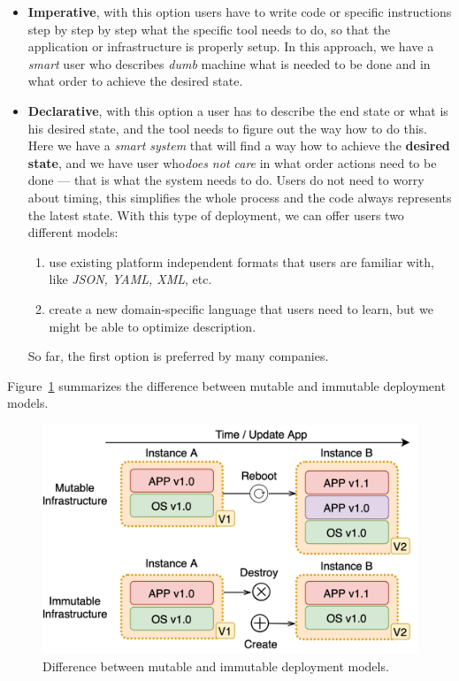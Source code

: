 \begin{itemize}
	\item \textbf{Imperative}, with this option users have to write code or specific instructions step by step by step what the specific tool needs to do, so that the application or infrastructure is properly setup. In this approach, we have a \textit{smart} user who describes \textit{dumb} machine what is needed to be done and in what order to achieve the desired state.
	\item \textbf{Declarative}, with this option a user has to describe the end state or what is his desired state, and the tool needs to figure out the way how to do this. Here we have a \textit{smart system} that will find a way how to achieve the \textbf{desired state}, and we have user who\textit{does not care} in what order actions need to be done --- that is what the system needs to do. Users do not need to worry about timing, this simplifies the whole process and the code always represents the latest state. With this type of deployment, we can offer users two different models: 
	
	\begin{enumerate}[start=1,label={(\bfseries \arabic*)}]
		\item use existing platform independent formats that users are familiar with, like \textit{JSON, YAML, XML}, etc.
		\item create a new domain-specific language that users need to learn, but we might be able to optimize description.
	\end{enumerate}
	
	So far, the first option is preferred by many companies.
\end{itemize}

\noindent
Figure~\ref{fig:fig12} summarizes the difference between mutable and immutable deployment models.

\begin{figure}[H]
	\begin{center}
		\includegraphics[scale=0.9]{images/Figure12.png}
	\end{center}
	\vspace{-0.6cm}
	\caption{Difference between mutable and immutable deployment models.}
	\label{fig:fig12}
\end{figure}

